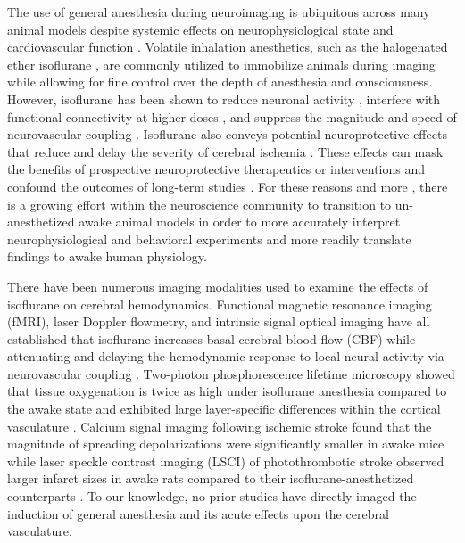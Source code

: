 \documentclass[review]{elsarticle}
\begin{document}
The use of general anesthesia during neuroimaging is ubiquitous across many animal models despite systemic effects on neurophysiological state and cardiovascular function \cite{Slupe:2018ea}. Volatile inhalation anesthetics, such as the halogenated ether isoflurane \cite{Eger:1981ia}, are commonly utilized to immobilize animals during imaging while allowing for fine control over the depth of anesthesia and consciousness. However, isoflurane has been shown to reduce neuronal activity \cite{Aksenov:2015ea}, interfere with functional connectivity at higher doses \cite{Xie:2019de}, and suppress the magnitude and speed of neurovascular coupling \cite{Masamoto:2012bj,Takuwa:2012ee,Pisauro:2013cx}. Isoflurane also conveys potential neuroprotective effects that reduce and delay the severity of cerebral ischemia \cite{Kitano:2007ia,Kawaguchi:2000id,Sakai:2007wc,Li:2013ip,Lu:2017bo}. These effects can mask the benefits of prospective neuroprotective therapeutics or interventions and confound the outcomes of long-term studies \cite{Kapinya:2002ua,Seto:2014ga}. For these reasons and more \cite{Gao:2017tw}, there is a growing effort within the neuroscience community to transition to un-anesthetized awake animal models in order to more accurately interpret neurophysiological and behavioral experiments and more readily translate findings to awake human physiology.

There have been numerous imaging modalities used to examine the effects of isoflurane on cerebral hemodynamics. Functional magnetic resonance imaging (fMRI), laser Doppler flowmetry, and intrinsic signal optical imaging have all established that isoflurane increases basal cerebral blood flow (CBF) while attenuating and delaying the hemodynamic response to local neural activity via neurovascular coupling \cite{Desai:2011mb,Aksenov:2015ea,Takuwa:2012ee,Pisauro:2013cx}. Two-photon phosphorescence lifetime microscopy showed that tissue oxygenation is twice as high under isoflurane anesthesia compared to the awake state and exhibited large layer-specific differences within the cortical vasculature \cite{Lyons:2016bd}. Calcium signal imaging following ischemic stroke found that the magnitude of spreading depolarizations were significantly smaller in awake mice \cite{Balbi:2017cj} while laser speckle contrast imaging (LSCI) of photothrombotic stroke observed larger infarct sizes in awake rats compared to their isoflurane-anesthetized counterparts \cite{Lu:2017bo}. To our knowledge, no prior studies have directly imaged the induction of general anesthesia and its acute effects upon the cerebral vasculature.
\end{document}
